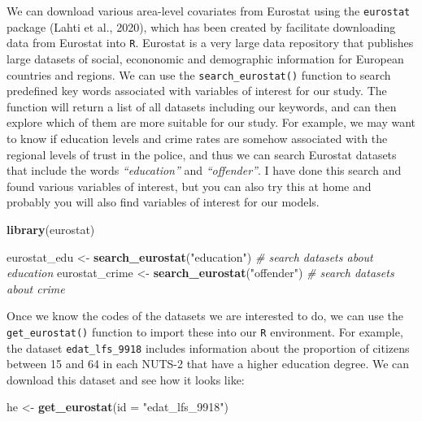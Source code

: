 \documentclass[
]{article}
\newenvironment{Shaded}{\begin{snugshade}}{\end{snugshade}}
\newcommand{\CommentTok}[1]{\textcolor[rgb]{0.56,0.35,0.01}{\textit{#1}}}
\newcommand{\DataTypeTok}[1]{\textcolor[rgb]{0.13,0.29,0.53}{#1}}
\newcommand{\KeywordTok}[1]{\textcolor[rgb]{0.13,0.29,0.53}{\textbf{#1}}}
\newcommand{\NormalTok}[1]{#1}
\newcommand{\StringTok}[1]{\textcolor[rgb]{0.31,0.60,0.02}{#1}}
\begin{document}
We can download various area-level covariates from Eurostat using the
\texttt{eurostat} package (Lahti et al., 2020), which has been created
by facilitate downloading data from Eurostat into \texttt{R}. Eurostat
is a very large data repository that publishes large datasets of social,
econonomic and demographic information for European countries and
regions. We can use the \texttt{search\_eurostat()} function to search
predefined key words associated with variables of interest for our
study. The function will return a list of all datasets including our
keywords, and can then explore which of them are more suitable for our
study. For example, we may want to know if education levels and crime
rates are somehow associated with the regional levels of trust in the
police, and thus we can search Eurostat datasets that include the words
\emph{``education''} and \emph{``offender''}. I have done this search
and found various variables of interest, but you can also try this at
home and probably you will also find variables of interest for our
models.

\begin{Shaded}
\begin{Highlighting}[]
\KeywordTok{library}\NormalTok{(eurostat)}

\NormalTok{eurostat_edu   <-}\StringTok{ }\KeywordTok{search_eurostat}\NormalTok{(}\StringTok{"education"}\NormalTok{) }\CommentTok{# search datasets about education}
\NormalTok{eurostat_crime <-}\StringTok{ }\KeywordTok{search_eurostat}\NormalTok{(}\StringTok{"offender"}\NormalTok{)  }\CommentTok{# search datasets about crime}
\end{Highlighting}
\end{Shaded}

Once we know the codes of the datasets we are interested to do, we can
use the \texttt{get\_eurostat()} function to import these into our
\texttt{R} environment. For example, the dataset
\texttt{edat\_lfs\_9918} includes information about the proportion of
citizens between 15 and 64 in each NUTS-2 that have a higher education
degree. We can download this dataset and see how it looks like:

\begin{Shaded}
\begin{Highlighting}[]
\NormalTok{he <-}\StringTok{ }\KeywordTok{get_eurostat}\NormalTok{(}\DataTypeTok{id =} \StringTok{"edat_lfs_9918"}\NormalTok{)}
\end{Highlighting}
\end{Shaded}
\end{document}

